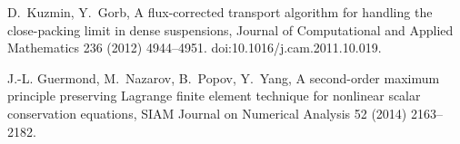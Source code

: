 \documentclass[xchauthor,chkrefs,fixeqskip,GCNS,amsmath,amsthm]{yjcphg}
\theoremstyle{remark}
\begin{document}
\begin{backmatter}
\begin{thebibliography}{}
\begin{bsubitem}
\begin{bcontribution}%
\end{bcontribution}
\begin{bhost}
\begin{bissue}
\end{bissue}
\end{bhost}
\end{bsubitem}
%
\OrigBibText
D.~Kuzmin, Y.~Gorb, A flux-corrected transport algorithm for handling
the close-packing limit in dense suspensions, Journal of Computational
and Applied Mathematics 236 (2012) 4944--4951.
\newblock doi:10.1016/j.cam.2011.10.019.
\endOrigBibText
{}%
\endbibitem

\begin{bsubitem}
\begin{bcontribution}%
\end{bcontribution}
\begin{bhost}
\begin{bissue}
\end{bissue}
\end{bhost}
\end{bsubitem}
%
\OrigBibText
J.-L. Guermond, M.~Nazarov, B.~Popov, Y.~Yang, A second-order maximum
principle preserving {L}agrange finite element technique for nonlinear
scalar conservation equations, SIAM Journal on Numerical Analysis 52
(2014) 2163--2182.
\endOrigBibText
{}%
\endbibitem


\end{thebibliography}
\end{backmatter}
\end{document}

